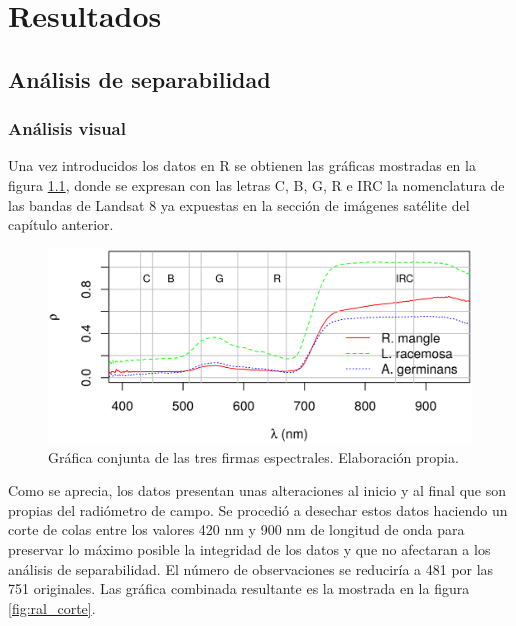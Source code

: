 


\chapter{Resultados}
\label{cap:resultados}

\section{Análisis de separabilidad}
\subsection{Análisis visual}
Una vez introducidos los datos en R se obtienen las gráficas mostradas en la figura \ref{fig:ral}, donde se expresan con las letras C, B, G, R e IRC la nomenclatura de las bandas de Landsat 8 ya expuestas en la sección de imágenes satélite del capítulo anterior.%


\begin{figure}
	\centering
	\includegraphics[width=0.8\linewidth]{./Imagenes/ral2.eps}
	\caption[Firmas espectrales de las tres especies]{Gráfica conjunta de las tres firmas espectrales. Elaboración propia.}
	\label{fig:ral}
\end{figure}

Como se aprecia, los datos presentan unas alteraciones al inicio y al final que son propias del radiómetro de campo. Se procedió a desechar estos datos haciendo un corte de colas entre los valores 420 nm y 900 nm de longitud de onda para preservar lo máximo posible la integridad de los datos y que no afectaran a los análisis de separabilidad. El número de observaciones se reduciría a 481 por las 751 originales. Las gráfica combinada resultante es la mostrada en la figura \ref{fig:ral_corte}.%

